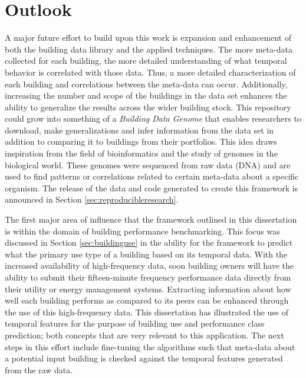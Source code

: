 \section{Outlook}
\label{sec:futuresteps}
A major future effort to build upon this work is expansion and enhancement of both the building data library and the applied techniques. The more meta-data collected for each building, the more detailed understanding of what temporal behavior is correlated with those data. Thus, a more detailed characterization of each building and correlations between the meta-data can occur. Additionally, increasing the number and scope of the buildings in the data set enhances the ability to generalize the results across the wider building stock. This repository could grow into something of a \emph{Building Data Genome} that enables researchers to download, make generalizations and infer information from the data set in addition to comparing it to buildings from their portfolios. This idea draws inspiration from the field of bioinformatics and the study of genomes in the biological world. These genomes were sequenced from raw data (DNA) and are used to find patterns or correlations related to certain meta-data about a specific organism. The release of the data and code generated to create this framework is announced in Section \ref{sec:reproducibleresearch}.

The first major area of influence that the framework outlined in this dissertation is within the domain of building performance benchmarking. This focus was discussed in Section \ref{sec:buildinguse} in the ability for the framework to predict what the primary use type of a building based on its temporal data. With the increased availability of high-frequency data, soon building owners will have the ability to submit their fifteen-minute frequency performance data directly from their utility or energy management systems. Extracting information about how well each building performs as compared to its peers can be enhanced through the use of this high-frequency data. This dissertation has illustrated the use of temporal features for the purpose of building use and performance class prediction; both concepts that are very relevant to this application. The next steps in this effort include fine-tuning the algorithms such that meta-data about a potential input building is checked against the temporal features generated from the raw data. 

